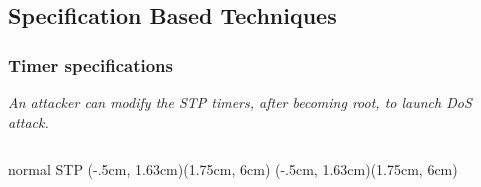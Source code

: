 \documentclass[10pt, blue,subsection=true, compress]{beamer}
\begin{document}
\subsection*{Specification Based Techniques}
\begin{frame} \frametitle{Timer specifications}
\emph{An attacker can modify the STP timers, after becoming root, to launch \textit{DoS} attack.}\
\begin{columns}[t]
  \begin{center}
 \begin{block}{normal STP}
(-.5cm, 1.63cm)(1.75cm, 6cm)
(-.5cm, 1.63cm)(1.75cm, 6cm)


\end{block}
\end{center}
\end{columns}
\end{frame}
\end{document}
